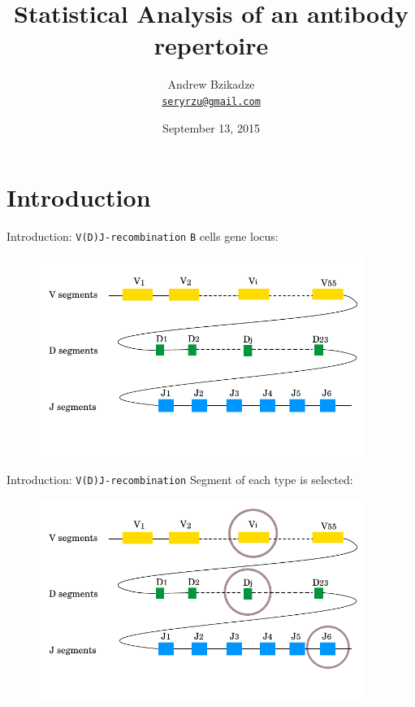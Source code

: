\documentclass{beamer}\usepackage[]{graphicx}\usepackage[]{color}
\title{Statistical Analysis of an antibody repertoire}
\author [Andrew Bzikadze]{Andrew Bzikadze\\ \texttt{\small{\href{mailto:seryrzu@gmail.com}{seryrzu@gmail.com}}}}
\date {
September 13, 2015
}
\begin{document}
\begin{frame}
  \titlepage
\end{frame}

\section{Introduction}

\begin{frame}{Introduction: \texttt{V(D)J-recombination}}
  \texttt{B} cells gene locus:
  \begin{figure}[h]
    \center\includegraphics[width=300pt]{Pictures/vdj1.pdf}
 \end{figure}
\end{frame}

\begin{frame}{Introduction: \texttt{V(D)J-recombination}}
  Segment of each type is selected: 
  \begin{figure}[h]
    \center\includegraphics[width=300pt]{Pictures/vdj2_select_genes.pdf}
 \end{figure}
\end{frame}
\end{document}
